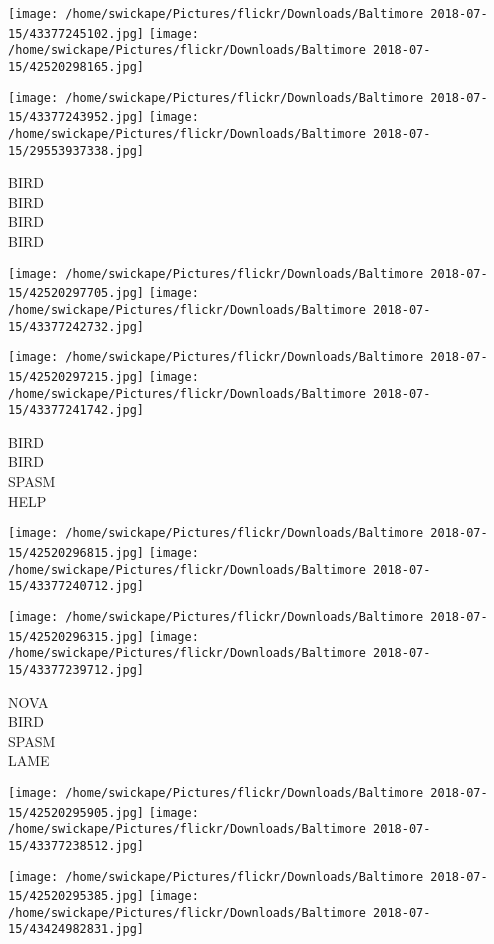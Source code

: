 \documentclass[10pt,letterpaper]{article}
\begin{document}
\texttt{[image: /home/swickape/Pictures/flickr/Downloads/Baltimore 2018-07-15/43377245102.jpg]}
\texttt{[image: /home/swickape/Pictures/flickr/Downloads/Baltimore 2018-07-15/42520298165.jpg]}

\texttt{[image: /home/swickape/Pictures/flickr/Downloads/Baltimore 2018-07-15/43377243952.jpg]}
\texttt{[image: /home/swickape/Pictures/flickr/Downloads/Baltimore 2018-07-15/29553937338.jpg]}

BIRD\\
BIRD\\
BIRD\\
BIRD
\pagebreak

\texttt{[image: /home/swickape/Pictures/flickr/Downloads/Baltimore 2018-07-15/42520297705.jpg]}
\texttt{[image: /home/swickape/Pictures/flickr/Downloads/Baltimore 2018-07-15/43377242732.jpg]}

\texttt{[image: /home/swickape/Pictures/flickr/Downloads/Baltimore 2018-07-15/42520297215.jpg]}
\texttt{[image: /home/swickape/Pictures/flickr/Downloads/Baltimore 2018-07-15/43377241742.jpg]}

BIRD\\
BIRD\\
SPASM\\
HELP
\pagebreak

\texttt{[image: /home/swickape/Pictures/flickr/Downloads/Baltimore 2018-07-15/42520296815.jpg]}
\texttt{[image: /home/swickape/Pictures/flickr/Downloads/Baltimore 2018-07-15/43377240712.jpg]}

\texttt{[image: /home/swickape/Pictures/flickr/Downloads/Baltimore 2018-07-15/42520296315.jpg]}
\texttt{[image: /home/swickape/Pictures/flickr/Downloads/Baltimore 2018-07-15/43377239712.jpg]}

NOVA\\
BIRD\\
SPASM\\
LAME
\pagebreak

\texttt{[image: /home/swickape/Pictures/flickr/Downloads/Baltimore 2018-07-15/42520295905.jpg]}
\texttt{[image: /home/swickape/Pictures/flickr/Downloads/Baltimore 2018-07-15/43377238512.jpg]}

\texttt{[image: /home/swickape/Pictures/flickr/Downloads/Baltimore 2018-07-15/42520295385.jpg]}
\texttt{[image: /home/swickape/Pictures/flickr/Downloads/Baltimore 2018-07-15/43424982831.jpg]}
\end{document}
